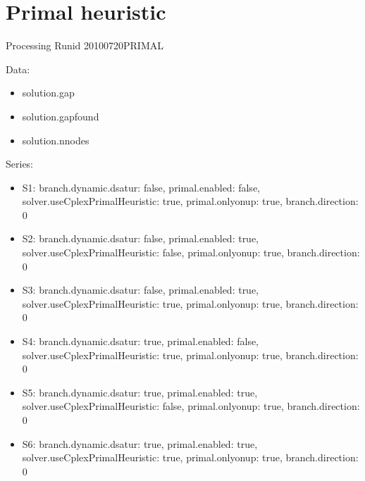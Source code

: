 \documentclass[landscape, 12pt]{report}
\begin{document}
	\clearpage
	
	\section{Primal heuristic}
	
	Processing Runid 20100720PRIMAL

Data:
\begin{itemize}
\item solution.gap
\item solution.gapfound
\item solution.nnodes
\end{itemize}
Series:
\begin{itemize}
\item S1: branch.dynamic.dsatur: false, primal.enabled: false, solver.useCplexPrimalHeuristic: true, primal.onlyonup: true, branch.direction: 0
\item S2: branch.dynamic.dsatur: false, primal.enabled: true, solver.useCplexPrimalHeuristic: false, primal.onlyonup: true, branch.direction: 0
\item S3: branch.dynamic.dsatur: false, primal.enabled: true, solver.useCplexPrimalHeuristic: true, primal.onlyonup: true, branch.direction: 0
\item S4: branch.dynamic.dsatur: true, primal.enabled: false, solver.useCplexPrimalHeuristic: true, primal.onlyonup: true, branch.direction: 0
\item S5: branch.dynamic.dsatur: true, primal.enabled: true, solver.useCplexPrimalHeuristic: false, primal.onlyonup: true, branch.direction: 0
\item S6: branch.dynamic.dsatur: true, primal.enabled: true, solver.useCplexPrimalHeuristic: true, primal.onlyonup: true, branch.direction: 0
\end{itemize}
\end{document}
